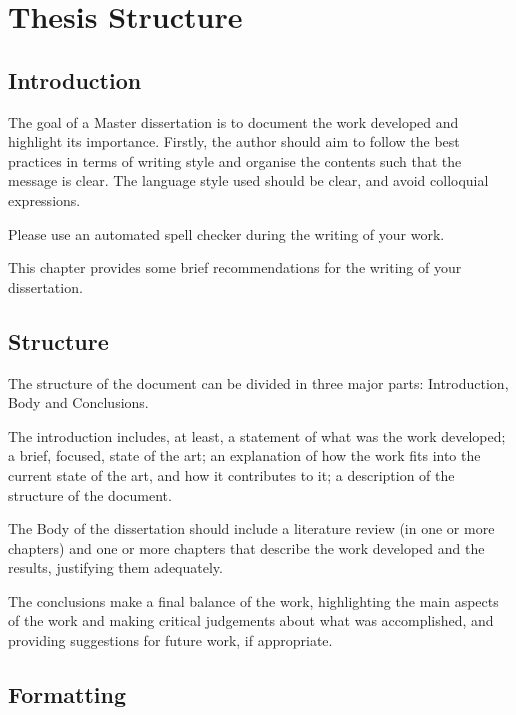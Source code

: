 % 
\chapter{Thesis Structure} %
\label{chap:Chapter1} %


%
\section{Introduction} 
\label{sec:chap1_introduction} %

The goal of a Master dissertation is to document the work developed and highlight its importance. Firstly, the author should aim to follow the best practices in terms of writing style and organise the contents such that the message is clear. The language style used should be clear, and avoid colloquial expressions.

Please use an automated spell checker during the writing of your work.

This chapter provides some brief recommendations for the writing of your dissertation. 

\section{Structure}

The structure of the document can be divided in three major parts: Introduction, Body and Conclusions.

The introduction includes, at least, a statement of what was the work developed; a brief, focused, state of the art; an explanation of how the work fits into the current state of the art, and how it contributes to it; a description of the structure of the document.

The Body of the dissertation should include a literature review (in one or more chapters) and one or more chapters that describe the work developed and the results, justifying them adequately.

The conclusions make a final balance of the work, highlighting the main aspects of the work and making critical judgements about what was accomplished, and providing suggestions for future work, if appropriate. 

\section{Formatting}

